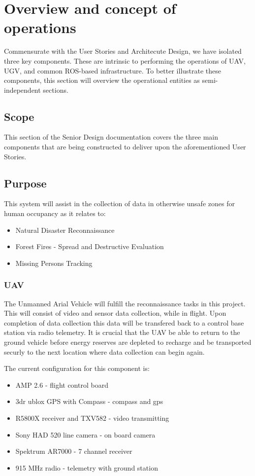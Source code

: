 
\chapter{Overview and concept of operations}
Commensurate with the User Stories and Architecute Design, we have isolated three key components.  These are intrinsic to performing the operations of UAV, UGV, and common ROS-based infrastructure.  To better illustrate these components, this section will overview the operational entities as semi-independent sections.


\section{Scope}
This section of the Senior Design documentation covers the three main components that are being constructed to deliver upon the aforementioned User Stories.


\section{Purpose}
This system will assist in the collection of data in otherwise unsafe zones for human occupancy as it relates to:

  \begin{itemize}
    \item Natural Disaster Reconnaissance
    \item Forest Fires - Spread and Destructive Evaluation
    \item Missing Persons Tracking
  \end{itemize}


\subsection{UAV}
The Unmanned Arial Vehicle will fulfill the reconnaissance tasks in this project. This will consist of video and sensor data collection, while in flight.  Upon completion of data collection this data will be transfered back to a control base station via radio telemetry.  It is crucial that the UAV be able to return to the ground vehicle before energy reserves are depleted to recharge and be transported securly to the next location where data collection can begin again.\newline



The current configuration for this component is:
  \begin{itemize}
    \item AMP 2.6 - flight control board
    \item 3dr ublox GPS with Compass - compass and gps
    \item R5800X receiver and TXV582 - video transmitting
    \item Sony HAD 520 line camera - on board camera
    \item Spektrum AR7000 - 7 channel receiver
    \item 915 MHz radio - telemetry with ground station
  \end{itemize}

